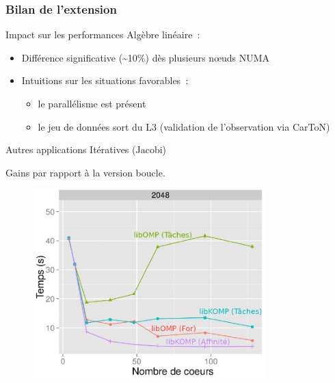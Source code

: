 \documentclass[xcolor={usenames,dvipsnames,svgnames,table}, aspectratio=43]{beamer}
\begin{document}
\begin{frame}
  \frametitle{Bilan de l'extension}

  \begin{block}{Impact sur les performances}
    Algèbre linéaire~:
    \begin{itemize}
      \item Différence significative (\textasciitilde 10\%) dès plusieurs nœuds NUMA
      \item Intuitions sur les situations favorables~:
      \begin{itemize}
	\item le parallélisme est présent
	\item le jeu de données sort du L3 (validation de l'observation via CarToN)
      \end{itemize}
    \end{itemize}
  \end{block}

  \begin{minipage}[t]{0.38\linewidth}
    \begin{block}{Autres applications}
      Itératives (Jacobi)

      Gains par rapport à la version boucle.
    \end{block}
  \end{minipage}
  \begin{minipage}[t]{0.60\linewidth}
    \vspace{-0.2cm}
    \begin{figure}
      \includegraphics[width=0.8\textwidth]{graph/jacobi_overview.pdf}%
    \end{figure}
  \end{minipage}
\end{frame}
\end{document}
